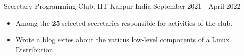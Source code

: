 \cventry
{Secretary} %
{Programming Club, IIT Kanpur} %
{India} %
{September 2021 - April 2022} %
{
  \begin{itemize} %
    \item Among the \textbf{25} selected secretaries responsible for activities of the club.
    \item Wrote a blog series about the various low-level components of a Linux Distribution.
  \end{itemize}
}
